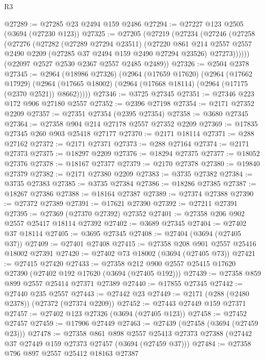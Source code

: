 \begin{lexlean}{R3}
\begin{coremodule}
@27289 := @27285 @23 @2494 @159 @2486
@27294 := @27227 @123 @2505 (@3694 (@27230 @123))
@27325 := @27205
    (@27219
      (@27234
        (@27246
          (@27258
            (@27276
              (@27282
                (@27289 @27294 @23511)
                (@27220
                  @861
                  @214
                  @2557
                  @2557
                  @2490
                  @2209
                  (@27285 @37 @2494 @159 @2490 @27294 @23526)
                  @27273))))))
      (@22097 @2527 @2530 @2367 @2557 @2485 @2489))
@27326 := @2504 @2378
@27345 := @2964
    (@18986 @27326)
    (@2964
      (@17659 @17620)
      (@2964
        (@17662 @17929)
        (@2964 (@17665 @18002) (@2964 (@17668 @18114) (@2964 (@17175 (@2370 @2521)) @8662)))))
@27346 := @3725 @27345
@27351 := @27346 @223 @172 @906 @27180 @2557
@27352 := @2396 @27198
@27354 := @2171 @27352 @2209
@27357 := @27351 @27354 (@2395 @27354)
@27358 := @3680 @27345
@27364 := @27358 @904 @214 @27178 @2557 @27352 @2209
@27369 := @17835 @27345 @260 @903 @25418 @27177
@27370 := @2171 @18114
@27371 := @288 @27162
@27372 := @2171 @27371
@27373 := @288 @27164
@27374 := @2171 @27373
@27375 := @18297 @2209
@27376 := @18294 @27375
@27377 := @18052 @27376
@27378 := @18167 @27377
@27379 := @2170 @27378
@27380 := @19840 @27379
@27382 := @2171 @27380 @2209
@27383 := @3735 @27382
@27384 := @3735 @27383
@27385 := @3735 @27384
@27386 := @18286 @27385
@27387 := @18267 @27386
@27388 := @18164 @27387
@27389 := @27374 @27388
@27390 := @27372 @27389
@27391 := @17621 @27390
@27392 := @27211 @27391
@27395 := @27369 (@27370 @27392) @27352
@27401 := @27358 @206 @902 @2557 @25417 @18114 @27392
@27402 := @3689 @27345
@27404 := @27402 @37 @18114
@27405 := @3695 @27345
@27408 := @27404 (@3694 (@27405 @37))
@27409 := @27401 @27408
@27415 := @27358 @208 @901 @2557 @25416 @18002 @27391
@27420 := @27402 @73 @18002 (@3694 (@27405 @73))
@27421 := @27415 @27420
@27433 := @27358 @212 @900 @2557 @25415 @17620 @27390 (@27402 @192 @17620 (@3694 (@27405 @192)))
@27439 := @27358 @859 @899 @2557 @25414 @27371 @27389
@27440 := @17855 @27345
@27442 := @27440 @235 @2557
@27443 := @27442 @23
@27449 := @2171 (@288 (@2480 @2378)) (@27372 (@27374 @2209))
@27452 := @27443 @27449 @159 @27371
@27457 := @27402 @123 @27326 (@3694 (@27405 @123))
@27458 := @27452 @27457
@27459 := @17906 @27449
@27463 := @27439 (@27458 (@3694 (@27459 @23)))
@27478 := @27358
    @861
    @898
    @2557
    @25413
    @27373
    @27388
    (@27442 @37 @27449 @159 @27373 @27457 (@3694 (@27459 @37)))
@27484 := @27358 @796 @897 @2557 @25412 @18163 @27387

\end{coremodule}
\end{lexlean}
